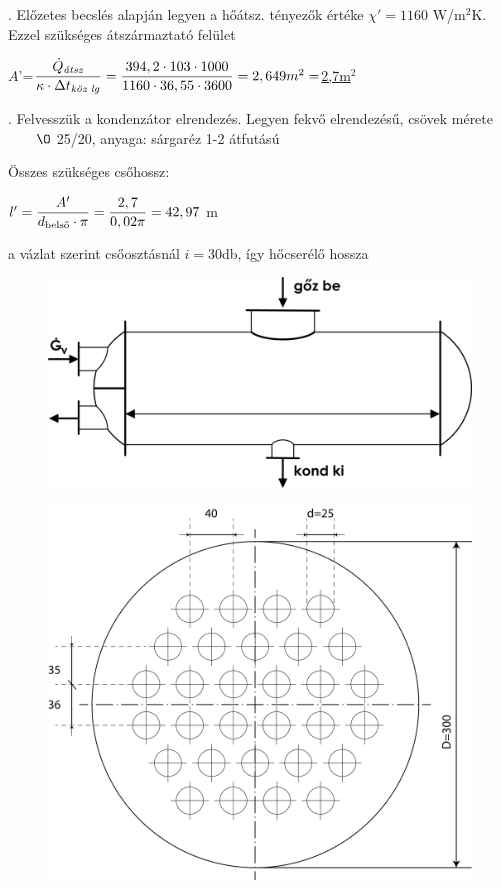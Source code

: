 \vspace{5mm}
. Előzetes becslés alapján legyen a hőátsz. tényezők értéke $\chi'=1160$ W/m$^2$K. Ezzel szükséges átszármaztató felület

\vspace{5mm}
$A$'=$\dfrac{\dot{Q}_{\textmd{\textit{átsz}}}}{\kappa\cdot\Delta t_{\textmd{\textit{köz lg}}}}=\dfrac{394,2\cdot103\cdot1000}{1160\cdot36,55\cdot3600}=2,649m^2=$\underline{2,7m$^2$}

\vspace{5mm}
. Felvesszük a kondenzátor elrendezés. Legyen fekvő elrendezésű, csövek mérete $\qquad \mathbf{\O}$ 25/20, anyaga: sárgaréz 1-2 átfutású

\vspace{5mm}
\noindent

Összes szükséges csőhossz: 

\vspace{5mm}
$l'=\dfrac{A'}{d_{\textmd{belső}}\cdot\pi}=\dfrac{2,7}{0,02\pi}=42,97$ m

\vspace{5mm}
a vázlat szerint csőosztásnál $i=$30db, így hőcserélő hossza

\begin{figure}[H]
	\begin{center}
		\includegraphics[width=0.5\linewidth]{u9awby123/fig03.png}
	\end{center}
\end{figure}

\begin{figure}[H]
	\begin{center}
		\includegraphics[width=0.5\linewidth]{u9awby123/fig04.png}
	\end{center}
\end{figure}

